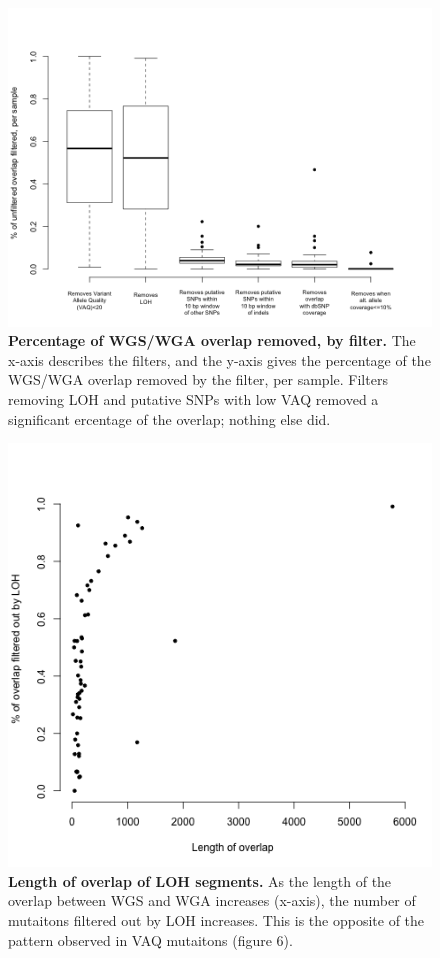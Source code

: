 \documentclass[11pt]{article} %
\begin{document}
\begin{figure}
\includegraphics[scale=1.0]{boxplot_percent_overlap_filtered.png}
\caption{\textbf{Percentage of WGS/WGA overlap removed, by filter.} The x-axis describes the filters, and the y-axis gives the percentage of the WGS/WGA overlap removed by the filter, per sample. Filters removing LOH and putative SNPs with low VAQ removed a significant ercentage of the overlap; nothing else did.}
\end{figure}

\begin{figure}
\includegraphics[scale=1.0]{./LOH_VAQ/LOH_all.png}
\caption{\textbf{Length of overlap of LOH segments.} As the length of the overlap between WGS and WGA increases (x-axis), the number of mutaitons filtered out by LOH increases. This is the opposite of the pattern observed in VAQ mutaitons (figure 6).}
\end{figure}
\end{document}
